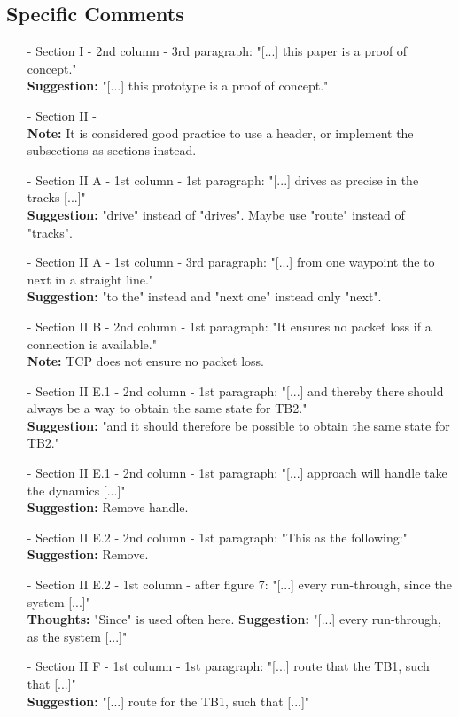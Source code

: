 \subsection{Specific Comments}
\begin{itemize}
  \item[-] Section I - 2nd column - 3rd paragraph: "[...] this paper is a proof of concept."\\
  \textbf{Suggestion:} "[...] this prototype is a proof of concept."

  \item[-] Section II - \\
	\textbf{Note:} It is considered good practice to use a header, or implement the subsections as sections instead.

  \item[-] Section II A - 1st column - 1st paragraph: "[...] drives as precise in the tracks [...]"\\
  \textbf{Suggestion:} "drive" instead of "drives". Maybe use "route" instead of "tracks".

  \item[-] Section II A - 1st column - 3rd paragraph: "[...] from one waypoint the to next in a straight line."\\
	\textbf{Suggestion:} "to the" instead and "next one" instead only "next".

	\item[-] Section II B - 2nd column - 1st paragraph: "It ensures no packet loss if a connection is available."\\
	\textbf{Note:} TCP does not ensure no packet loss. 

	\item[-] Section II E.1 - 2nd column - 1st paragraph: "[...] and thereby there should always be a way to obtain the same state for TB2."\\
	\textbf{Suggestion:} "and it should therefore be possible to obtain the same state for TB2."

	\item[-] Section II E.1 - 2nd column - 1st paragraph: "[...] approach will handle take the dynamics [...]"\\
	\textbf{Suggestion:} Remove handle.

	\item[-] Section II E.2 - 2nd column - 1st paragraph: "This as the following:"\\
	\textbf{Suggestion:} Remove.

	\item[-] Section II E.2 - 1st column - after figure 7: "[...] every run-through, since the system [...]"\\
	\textbf{Thoughts:} "Since" is used often here.
	\textbf{Suggestion:} "[...] every run-through, as the system [...]"
	

	\item[-] Section II F - 1st column - 1st paragraph: "[...] route that the TB1, such that [...]"\\
	\textbf{Suggestion:} "[...] route for the TB1, such that [...]"
\end{itemize}

